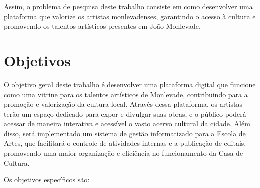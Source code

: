 Assim, o problema de pesquisa deste trabalho consiste em como desenvolver uma plataforma que valorize os artistas monlevadenses, garantindo o acesso à cultura e promovendo os talentos artísticos presentes em João Monlevade.

\section{Objetivos}
\label{sec:objetivos}

O objetivo geral deste trabalho é desenvolver uma plataforma digital que funcione como uma vitrine para os talentos artísticos de Monlevade, contribuindo para a promoção e valorização da cultura local. Através dessa plataforma, os artistas terão um espaço dedicado para expor e divulgar suas obras, e o público poderá acessar de maneira interativa e acessível o vasto acervo cultural da cidade. Além disso, será implementado um sistema de gestão informatizado para a Escola de Artes, que facilitará o controle de atividades internas e a publicação de editais, promovendo uma maior organização e eficiência no funcionamento da Casa de Cultura.

Os objetivos específicos são:

